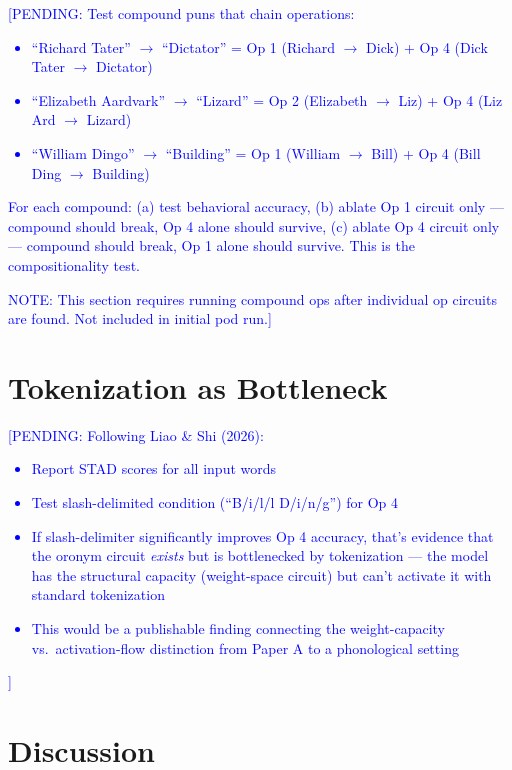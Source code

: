 \documentclass[11pt,a4paper]{article}
\newcommand{\PENDING}[1]{\textcolor{blue}{[PENDING: #1]}}
\begin{document}
\PENDING{Test compound puns that chain operations:
\begin{itemize}
  \item ``Richard Tater'' $\to$ ``Dictator'' = Op 1 (Richard $\to$ Dick) + Op 4 (Dick Tater $\to$ Dictator)
  \item ``Elizabeth Aardvark'' $\to$ ``Lizard'' = Op 2 (Elizabeth $\to$ Liz) + Op 4 (Liz Ard $\to$ Lizard)
  \item ``William Dingo'' $\to$ ``Building'' = Op 1 (William $\to$ Bill) + Op 4 (Bill Ding $\to$ Building)
\end{itemize}

For each compound: (a) test behavioral accuracy, (b) ablate Op 1 circuit only
--- compound should break, Op 4 alone should survive, (c) ablate Op 4 circuit
only --- compound should break, Op 1 alone should survive. This is the
compositionality test.

NOTE: This section requires running compound ops after individual op circuits
are found. Not included in initial pod run.}

\section{Tokenization as Bottleneck}

\PENDING{Following Liao \& Shi (2026):
\begin{itemize}
  \item Report STAD scores for all input words
  \item Test slash-delimited condition (``B/i/l/l D/i/n/g'') for Op 4
  \item If slash-delimiter significantly improves Op 4 accuracy, that's
  evidence that the oronym circuit \emph{exists} but is bottlenecked by
  tokenization --- the model has the structural capacity (weight-space
  circuit) but can't activate it with standard tokenization
  \item This would be a publishable finding connecting the weight-capacity
  vs.\ activation-flow distinction from Paper A to a phonological setting
\end{itemize}}

\section{Discussion}
\end{document}
